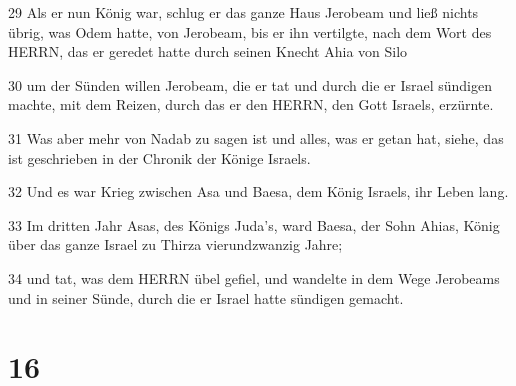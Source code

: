 \par 29 Als er nun König war, schlug er das ganze Haus Jerobeam und ließ nichts übrig, was Odem hatte, von Jerobeam, bis er ihn vertilgte, nach dem Wort des HERRN, das er geredet hatte durch seinen Knecht Ahia von Silo
\par 30 um der Sünden willen Jerobeam, die er tat und durch die er Israel sündigen machte, mit dem Reizen, durch das er den HERRN, den Gott Israels, erzürnte.
\par 31 Was aber mehr von Nadab zu sagen ist und alles, was er getan hat, siehe, das ist geschrieben in der Chronik der Könige Israels.
\par 32 Und es war Krieg zwischen Asa und Baesa, dem König Israels, ihr Leben lang.
\par 33 Im dritten Jahr Asas, des Königs Juda's, ward Baesa, der Sohn Ahias, König über das ganze Israel zu Thirza vierundzwanzig Jahre;
\par 34 und tat, was dem HERRN übel gefiel, und wandelte in dem Wege Jerobeams und in seiner Sünde, durch die er Israel hatte sündigen gemacht.

\chapter{16}

